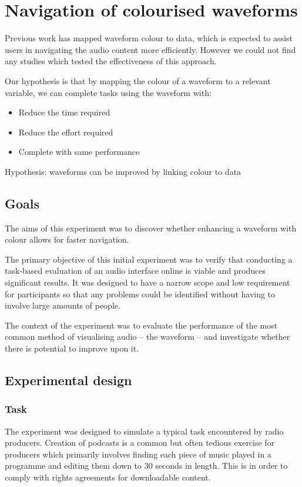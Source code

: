 
\chapter{Navigation of colourised waveforms}\label{sec:study1}

Previous work has mapped waveform colour to data, which is expected to assist
users in navigating the audio content more efficiently. However we could not
find any studies which tested the effectiveness of this approach.

Our hypothesis is that by mapping the colour of a waveform to a relevant variable,
we can complete tasks using the waveform with:
\begin{itemize}
  \item Reduce the time required
  \item Reduce the effort required
  \item Complete with same performance
\end{itemize}

Hypothesis: waveforms can be improved by linking colour to data

\section{Goals}

The aims of this experiment was to discover whether enhancing a waveform with
colour allows for faster navigation.

The primary objective of this initial experiment was to verify that conducting
a task-based evaluation of an audio interface online is viable and produces
significant results. It was designed to have a narrow scope and low requirement
for participants so that any problems could be identified without having to
involve large amounts of people.

The context of the experiment was to evaluate the performance of the most
common method of visualising audio -- the waveform -- and investigate whether
there is potential to improve upon it.

\section{Experimental design}

\subsection{Task}\label{sec:studytask}
The experiment was designed to simulate a typical task encountered by radio
producers. Creation of podcasts is a common but often tedious exercise for
producers which primarily involves finding each piece of music played in a
programme and editing them down to 30 seconds in length. This is in order to
comply with rights agreements for downloadable content.

